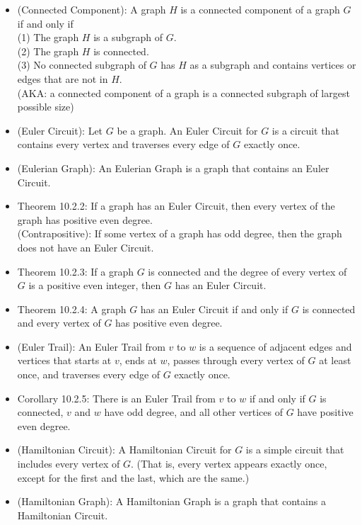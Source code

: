\documentclass{article}
\begin{document}
\begin{itemize}
    \item (Connected Component): A graph $H$ is a connected component of a graph $G$ if and only if
        \\ \hspace*{3mm} (1) The graph $H$ is a subgraph of $G$.
        \\ \hspace*{3mm} (2) The graph $H$ is connected.
        \\ \hspace*{3mm} (3) No connected subgraph of $G$ has $H$ as a subgraph and contains vertices or edges that are not in $H$.
        \\ (AKA: a connected component of a graph is a connected subgraph of largest possible size)
    \item (Euler Circuit): Let $G$ be a graph. An Euler Circuit for $G$ is a circuit that contains every vertex and traverses every edge of $G$ exactly once.
    \item (Eulerian Graph): An Eulerian Graph is a graph that contains an Euler Circuit.
    \item Theorem 10.2.2: If a graph has an Euler Circuit, then every vertex of the graph has positive even degree.
        \\ (Contrapositive): If some vertex of a graph has odd degree, then the graph does not have an Euler Circuit.
    \item Theorem 10.2.3: If a graph $G$ is connected and the degree of every vertex of $G$ is a positive even integer, then $G$ has an Euler Circuit.
    \item Theorem 10.2.4: A graph $G$ has an Euler Circuit if and only if $G$ is connected and every vertex of $G$ has positive even degree.
    \item (Euler Trail): An Euler Trail from $v$ to $w$ is a sequence of adjacent edges and vertices that starts at $v$, ends at $w$, passes through every vertex of $G$ at least once, and traverses every edge of $G$ exactly once.
    \item Corollary 10.2.5: There is an Euler Trail from $v$ to $w$ if and only if $G$ is connected, $v$ and $w$ have odd degree, and all other vertices of $G$ have positive even degree.
    \item (Hamiltonian Circuit): A Hamiltonian Circuit for $G$ is a simple circuit that includes every vertex of $G$. (That is, every vertex appears exactly once, except for the first and the last, which are the same.)
    \item (Hamiltonian Graph): A Hamiltonian Graph is a graph that contains a Hamiltonian Circuit.

\end{itemize}
\end{document}
